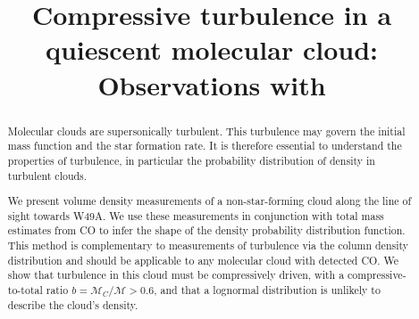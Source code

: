 \title{Compressive turbulence in a quiescent molecular cloud: Observations with
\formaldehyde}
\begin{abstract}
    Molecular clouds are supersonically turbulent.  This turbulence may govern
    the initial mass function and the star formation rate.  It is therefore
    essential to understand the properties of turbulence, in particular the
    probability distribution of density in turbulent clouds.

    We present \formaldehyde volume density measurements of a non-star-forming
    cloud along the line of sight towards W49A. We use these measurements in
    conjunction with total mass estimates from CO to infer the shape of the
    density probability distribution function.  This method is complementary to
    measurements of turbulence via the column density distribution and should
    be applicable to any molecular cloud with detected CO.  We show that
    turbulence in this cloud must be compressively driven, with a
    compressive-to-total ratio $b = \mathcal{M}_C/\mathcal{M}>0.6$, and that a
    lognormal distribution is unlikely to describe the cloud's density.  

\end{abstract}
